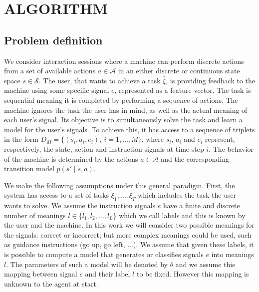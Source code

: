 \section{ALGORITHM}
\label{sec:algorithm}

\subsection{Problem definition}

We consider interaction sessions where a machine can perform discrete actions from a set of available actions $a \in \mathcal{A}$ in an either discrete or continuous state space $s \in \mathcal{S}$. The user, that wants to achieve a task $\hat{\xi}$, is providing feedback to the machine using some specific signal $e$, represented as a feature vector. The task is sequential meaning it is completed by performing a sequence of actions. The machine ignores the task the user has in mind, as well as the actual meaning of each user's signal. Its objective is to simultaneously solve the task and learn a model for the user's signals. To achieve this, it has access to a sequence of triplets in the form $D_M = \{(s_i, a_i, e_i),\ i = 1,\ldots,M\}$, where $s_i$, $a_i$ and $e_i$ represent, respectively, the state, action and instruction signals at time step $i$. The behavior of the machine is determined by the actions $a\in\mathcal{A}$ and the corresponding transition model $p(s'\mid s,a)$.


We make the following assumptions under this general paradigm. First, the system has access to a set of tasks $\xi_1,\ldots,\xi_T$ which includes the task the user wants to solve. We assume the instruction signals $e$ have a finite and discrete number of meanings $l \in \{l_1, l_2, \ldots, l_L\}$ which we call labels and this is known by the user and the machine. In this work we will consider two possible meanings for the signals: correct or incorrect; but more complex meanings could be used, such as guidance instructions (go up, go left, ...). We assume that given these labels, it is possible to compute a model that generates or classifies signals $e$ into meanings $l$. The parameters of such a model will be denoted by $\theta$ and we assume this mapping between signal $e$ and their label $l$ to be fixed. However this mapping is unknown to the agent at start.


 
